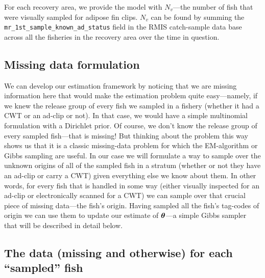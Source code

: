 \documentclass[11pt]{article}
\def\bm#1{\mathpalette\bmstyle{#1}}
\def\bmstyle#1#2{\mbox{\boldmath$#1#2$}}
\newcommand{\btheta}{\bm{\theta}}
\begin{document}
For each recovery area, we provide the model with $N_v$---the number of fish that were
visually sampled for adipose fin clips.  $N_v$ can be found by summing the {\tt mr\_1st\_sample\_known\_ad\_status} field in the RMIS catch-sample data base across all the fisheries in the recovery area over the
time in question.  

\subsection{Missing data formulation}
We can develop our estimation framework by noticing that we are missing information here
that would make the estimation problem quite easy---namely, if we knew the release group of every
fish we sampled in a fishery (whether it had a CWT or an ad-clip or not).  In that case, we would have a simple multinomial
formulation with a Dirichlet prior.  Of course, we don't know the release group of every sampled
fish---that is missing!  But thinking about the problem this way shows us that it is a classic
missing-data problem for which the EM-algorithm or Gibbs sampling are useful.  In our case we will
formulate a way to sample over the unknown origins of all of the sampled fish in a stratum (whether or 
not they have an ad-clip or carry a CWT) given 
everything else we know about them.
In other words, for every fish that is handled in some way (either visually inspected for an ad-clip or
electronically scanned for a CWT) we can sample over that crucial piece of missing data---the fish's origin.
Having sampled all the fish's tag-codes of origin we can use them to update our estimate of
$\btheta$---a simple Gibbs sampler that will be described in detail below.

\subsection{The data (missing and otherwise) for each ``sampled'' fish}
\end{document}

